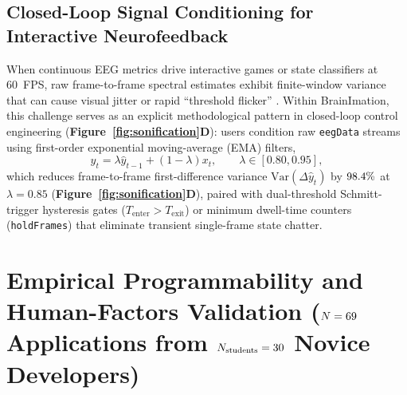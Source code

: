 \documentclass[10pt,twocolumn]{article}
\begin{document}
\subsection{Closed-Loop Signal Conditioning for Interactive Neurofeedback}
When continuous EEG metrics drive interactive games or state classifiers at 60~FPS, raw frame-to-frame spectral estimates exhibit finite-window variance that can cause visual jitter or rapid ``threshold flicker'' \citep{lotte2013flaws}. Within BrainImation, this challenge serves as an explicit methodological pattern in closed-loop control engineering (\textbf{Figure~\ref{fig:sonification}D}): users condition raw \texttt{eegData} streams using first-order exponential moving-average (EMA) filters,
\begin{equation}
\hat{y}_{t} = \lambda \hat{y}_{t-1} + (1 - \lambda) x_{t}, \qquad \lambda \in [0.80, 0.95],
\end{equation}
which reduces frame-to-frame first-difference variance $\text{Var}(\Delta \hat{y}_t)$ by $98.4\%$ at $\lambda = 0.85$ (\textbf{Figure~\ref{fig:sonification}D}), paired with dual-threshold Schmitt-trigger hysteresis gates ($T_{\text{enter}} > T_{\text{exit}}$) or minimum dwell-time counters (\texttt{holdFrames}) that eliminate transient single-frame state chatter.

\section{Empirical Programmability and Human-Factors Validation (\texorpdfstring{$N = 69$}{N = \NStudentSketches} Applications from \texorpdfstring{$N_{\text{students}} = 30$}{N\_students = \NUniqueStudents} Novice Developers)}
\end{document}
